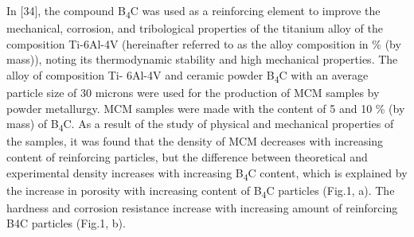 In {[}34{]}, the compound B\textsubscript{4}C was used as a reinforcing
element to improve the mechanical, corrosion, and tribological
properties of the titanium alloy of the composition Ti-6Al-4V
(hereinafter referred to as the alloy composition in \% (by mass)),
noting its thermodynamic stability and high mechanical properties. The
alloy of composition Ti- 6Al-4V and ceramic powder B\textsubscript{4}C
with an average particle size of 30 microns were used for the production
of MCM samples by powder metallurgy. MCM samples were made with the
content of 5 and 10 \% (by mass) of B\textsubscript{4}C. As a result of
the study of physical and mechanical properties of the samples, it was
found that the density of MCM decreases with increasing content of
reinforcing particles, but the difference between theoretical and
experimental density increases with increasing B\textsubscript{4}C
content, which is explained by the increase in porosity with increasing
content of B\textsubscript{4}C particles (Fig.1, a). The hardness and
corrosion resistance increase with increasing amount of reinforcing B4C
particles (Fig.1, b).


